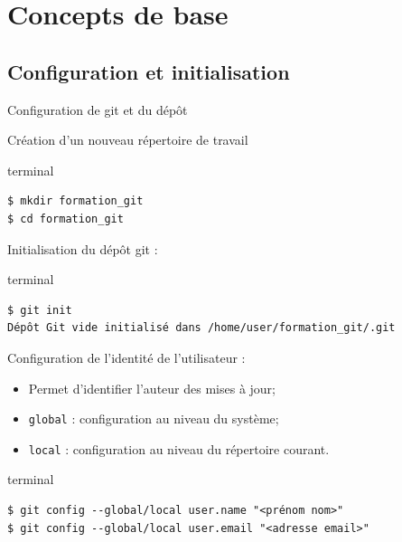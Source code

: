 \documentclass[usepdftitle=false]{beamer}
\def\seplength{.3\topsep}
\newcommand{\Pause}{%
\ifdef{\Release}
  {\pause}
  {}
}
\begin{document}
\section{Concepts de base}

\subsection{Configuration et initialisation}

\begin{frame}[fragile]{Configuration de git et du dépôt}

Création d'un nouveau répertoire de travail
\begin{beamercolorbox}[rounded=true,shadow=true]{terminal}
\vspace{-\seplength}
\begin{Verbatim}
$ mkdir formation_git
$ cd formation_git
\end{Verbatim}
\end{beamercolorbox}

\Pause

Initialisation du dépôt git :
\begin{beamercolorbox}[rounded=true,shadow=true]{terminal}
\vspace{-\seplength}
\begin{Verbatim}
$ git init
Dépôt Git vide initialisé dans /home/user/formation_git/.git
\end{Verbatim}
\end{beamercolorbox}

\Pause

Configuration de l'identité de l'utilisateur :
\begin{itemize}
\item Permet d'identifier l'auteur des mises à jour;
\item \verb+global+ : configuration au niveau du système;
\item \verb+local+ : configuration au niveau du répertoire courant.
\end{itemize}

\begin{beamercolorbox}[rounded=true,shadow=true]{terminal}
\vspace{-\seplength}
\begin{Verbatim}
$ git config --global/local user.name "<prénom nom>"
$ git config --global/local user.email "<adresse email>"
\end{Verbatim}
\end{beamercolorbox}

\end{frame}
\end{document}
